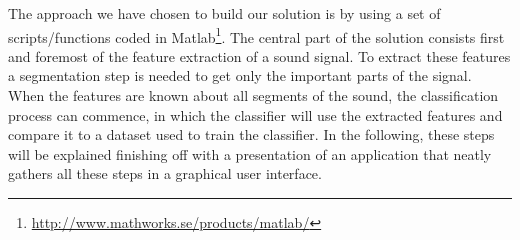 The approach we have chosen to build our solution is by using a set of scripts/functions coded in Matlab\footnote{\url{http://www.mathworks.se/products/matlab/}}. The central part of the solution consists first and foremost of the feature extraction of a sound signal. To extract these features a segmentation step is needed to get only the important parts of the signal. When the features are known about all segments of the sound, the classification process can commence, in which the classifier will use the extracted features and compare it to a dataset used to train the classifier. In the following, these steps will be explained finishing off with a presentation of an application that neatly gathers all these steps in a graphical user interface.